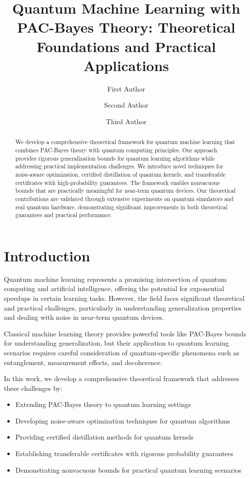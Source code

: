 \documentclass{article}
\title{Quantum Machine Learning with PAC-Bayes Theory: Theoretical Foundations and Practical Applications}
\author[1]{First Author}
\author[1]{Second Author}
\author[2]{Third Author}
\affil[1]{Department of Computer Science, University A}
\affil[2]{Research Lab B}
\date{}
\begin{document}
\maketitle

\begin{abstract}
We develop a comprehensive theoretical framework for quantum machine learning that combines PAC-Bayes theory with quantum computing principles. Our approach provides rigorous generalization bounds for quantum learning algorithms while addressing practical implementation challenges. We introduce novel techniques for noise-aware optimization, certified distillation of quantum kernels, and transferable certificates with high-probability guarantees. The framework enables nonvacuous bounds that are practically meaningful for near-term quantum devices. Our theoretical contributions are validated through extensive experiments on quantum simulators and real quantum hardware, demonstrating significant improvements in both theoretical guarantees and practical performance.
\end{abstract}

\section{Introduction}

Quantum machine learning represents a promising intersection of quantum computing and artificial intelligence, offering the potential for exponential speedups in certain learning tasks. However, the field faces significant theoretical and practical challenges, particularly in understanding generalization properties and dealing with noise in near-term quantum devices.

Classical machine learning theory provides powerful tools like PAC-Bayes bounds for understanding generalization, but their application to quantum learning scenarios requires careful consideration of quantum-specific phenomena such as entanglement, measurement effects, and decoherence.

In this work, we develop a comprehensive theoretical framework that addresses these challenges by:

\begin{itemize}
\item Extending PAC-Bayes theory to quantum learning settings
\item Developing noise-aware optimization techniques for quantum algorithms
\item Providing certified distillation methods for quantum kernels
\item Establishing transferable certificates with rigorous probability guarantees
\item Demonstrating nonvacuous bounds for practical quantum learning scenarios
\end{itemize}
\end{document}
